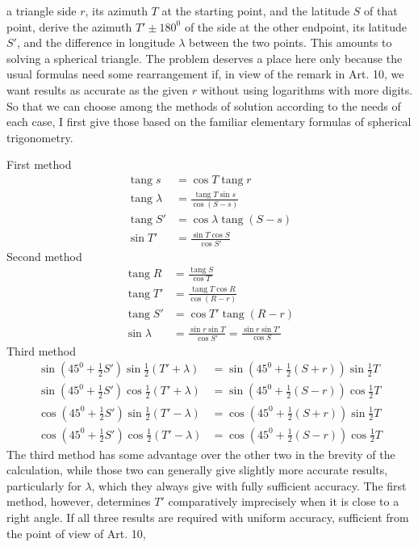 %
a triangle side \(r\), its azimuth \(T\) at the starting point, and the latitude \(S\) of that point, derive the azimuth \(T'\pm180^0\) of the side at the other endpoint, its latitude \(S'\), and the difference in longitude \(\lambda\) between the two points. This amounts to solving a spherical triangle. The problem deserves a place here only because the usual formulas need some rearrangement if, in view of the remark in Art. 10, we want results as accurate as the given \(r\) without using logarithms with more digits. So that we can choose among the methods of solution according to the needs of each case, I first give those based on the familiar elementary formulas of spherical trigonometry.

First method
\[
\begin{aligned}
\operatorname{tang}s&=\cos T\operatorname{tang}r\\
\operatorname{tang}\lambda&=\frac{\operatorname{tang}T\sin s}{\cos(S-s)}\\
\operatorname{tang}S'&=\cos\lambda\operatorname{tang}(S-s)\\
\sin T'&=\frac{\sin T\cos S}{\cos S'}
\end{aligned}
\]
\indent Second method
\[
\begin{aligned}
\operatorname{tang}R&=\frac{\operatorname{tang}S}{\cos T}\\
\operatorname{tang}T'&=\frac{\operatorname{tang}T\cos R}{\cos(R-r)}\\
\operatorname{tang}S'&=\cos T'\operatorname{tang}(R-r)\\
\sin\lambda&=\frac{\sin r\sin T}{\cos S'}=\frac{\sin r\sin T'}{\cos S}
\end{aligned}
\]
\indent Third method
\[
\begin{aligned}
\sin(45^0+\tfrac{1}{2}S')\sin\tfrac{1}{2}(T'+\lambda)&=\sin(45^0+\tfrac{1}{2}(S+r))\sin\tfrac{1}{2}T\\
\sin(45^0+\tfrac{1}{2}S')\cos\tfrac{1}{2}(T'+\lambda)&=\sin(45^0+\tfrac{1}{2}(S-r))\cos\tfrac{1}{2}T\\
\cos(45^0+\tfrac{1}{2}S')\sin\tfrac{1}{2}(T'-\lambda)&=\cos(45^0+\tfrac{1}{2}(S+r))\sin\tfrac{1}{2}T\\
\cos(45^0+\tfrac{1}{2}S')\cos\tfrac{1}{2}(T'-\lambda)&=\cos(45^0+\tfrac{1}{2}(S-r))\cos\tfrac{1}{2}T
\end{aligned}
\]
\indent The third method has some advantage over the other two in the brevity of the calculation, while those two can generally give slightly more accurate results, particularly for \(\lambda\), which they always give with fully sufficient accuracy. The first method, however, determines \(T'\) comparatively imprecisely when it is close to a right angle. If all three results are required with uniform accuracy, sufficient from the point of view of Art. 10,
